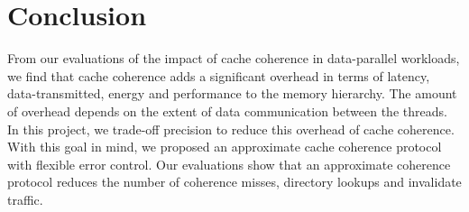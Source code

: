 \section{Conclusion}

From our evaluations of the impact of cache coherence in data-parallel
workloads, we find that cache coherence adds a significant overhead in terms of
latency, data-transmitted, energy and performance to the memory hierarchy. The
amount of overhead depends on the extent of data communication between the
threads. In this project, we trade-off precision to reduce this overhead of
cache coherence. With this goal in mind, we proposed an approximate cache
coherence protocol with flexible error control. Our evaluations show that an
approximate coherence protocol reduces the number of coherence misses,
directory lookups and invalidate traffic. 
